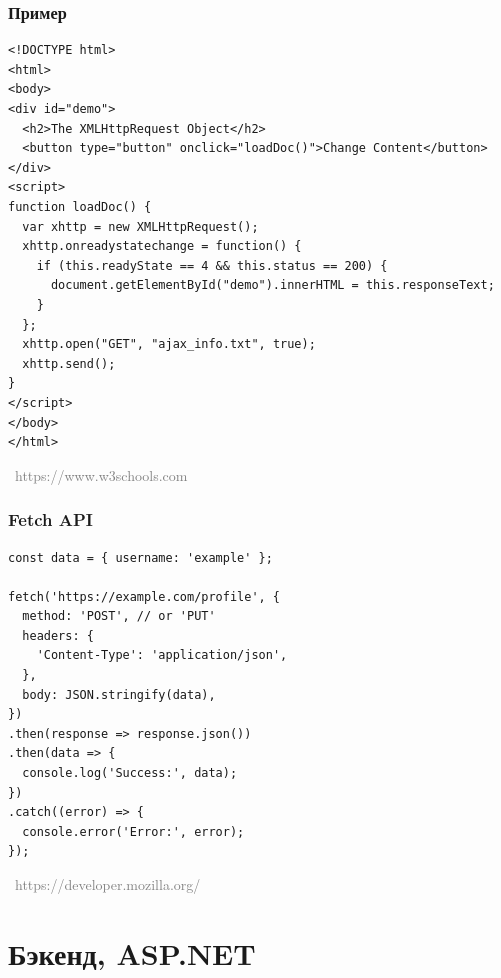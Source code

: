 \documentclass[xetex,mathserif,serif]{beamer}
\newcommand{\attribution}[1] {
\vspace{-5mm}\begin{flushright}\begin{scriptsize}\textcolor{gray}{\textcopyright\, #1}\end{scriptsize}\end{flushright}
}
\begin{document}
    \begin{frame}[fragile]
        \frametitle{Пример}
        \begin{scriptsize}
            \begin{verbatim}
<!DOCTYPE html>
<html>
<body>
<div id="demo">
  <h2>The XMLHttpRequest Object</h2>
  <button type="button" onclick="loadDoc()">Change Content</button>
</div>
<script>
function loadDoc() {
  var xhttp = new XMLHttpRequest();
  xhttp.onreadystatechange = function() {
    if (this.readyState == 4 && this.status == 200) {
      document.getElementById("demo").innerHTML = this.responseText;
    }
  };
  xhttp.open("GET", "ajax_info.txt", true);
  xhttp.send();
}
</script>
</body>
</html>
            \end{verbatim}
        \end{scriptsize}
        \vspace{-3mm}
        \attribution{https://www.w3schools.com}
    \end{frame}

    \begin{frame}[fragile]
        \frametitle{Fetch API}
        \begin{scriptsize}
            \begin{verbatim}
const data = { username: 'example' };

fetch('https://example.com/profile', {
  method: 'POST', // or 'PUT'
  headers: {
    'Content-Type': 'application/json',
  },
  body: JSON.stringify(data),
})
.then(response => response.json())
.then(data => {
  console.log('Success:', data);
})
.catch((error) => {
  console.error('Error:', error);
});
            \end{verbatim}
        \end{scriptsize}
        \vspace{-3mm}
        \attribution{https://developer.mozilla.org/}
    \end{frame}

    \section{Бэкенд, ASP.NET}
\end{document}
